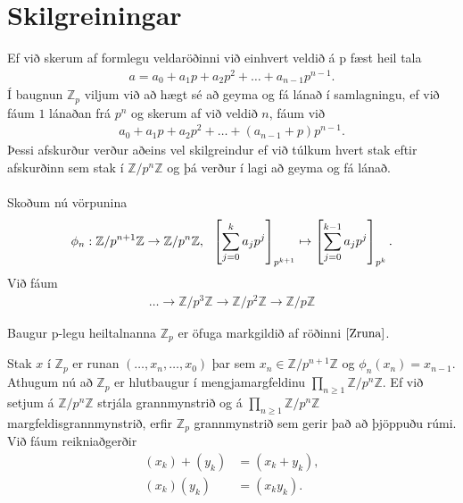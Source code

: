 \section*{Skilgreiningar}
Ef við skerum af formlegu veldaröðinni við einhvert veldið á p fæst heil tala 
\begin{align*}
a = a_0 + a_1 p + a_2 p^2 + \ldots + a_{n-1}p^{n-1}. 
\end{align*}
Í baugnun $\mathbb{Z}_p$ viljum við að hægt sé að geyma og fá lánað í samlagningu, ef við 
fáum $1$ lánaðan frá $p^n$ og skerum af við veldið $n$, fáum við 
\begin{align*}
 a_0 + a_1 p + a_2 p^2 + \ldots + (a_{n-1} + p)p^{n-1}.
\end{align*}
Þessi afskurður verður aðeins vel skilgreindur ef við túlkum hvert 
stak eftir afskurðinn sem stak í $\mathbb{Z}/p^n \mathbb{Z}$ og þá 
verður í lagi að geyma og fá lánað.\\
\\Skoðum nú vörpunina
\begin{align*}
 \centering \phi_n : \mathbb{Z}/p^{n+1} \mathbb{Z} \rightarrow 
 \mathbb{Z}/p^{n} \mathbb{Z}, \ \  \left[\sum_{j=0}^k a_j p^j \right]
_{p^{k+1}} \mapsto \left[\sum_{j=0}^{k-1} a_j p^j \right]_{p^k}.
\end{align*}
Við fáum
\begin{align}\label{Zruna}
 \ldots \rightarrow \mathbb{Z}/p^{3} \mathbb{Z} \rightarrow \mathbb{Z}/p^{2} 
\mathbb{Z} \rightarrow \mathbb{Z}/p \mathbb{Z}
\end{align}
\begin{skilgr}
 Baugur p-legu heiltalnanna $\mathbb{Z}_p$ er öfuga markgildið af 
röðinni $\ref{Zruna}$.
\end{skilgr}
Stak $x$ í $\mathbb{Z}_p$ er runan $(\ldots , x_n, \ldots, x_0)$ þar sem 
$x_n \in \mathbb{Z}/p^{n+1}\mathbb{Z}$ og $\phi_n(x_{n}) = x_{n-1}$.
Athugum nú að $\mathbb{Z}_p$ er hlutbaugur í mengjamargfeldinu
 $\prod_{n \geq 1} \mathbb{Z}/p^n\mathbb{Z}$. Ef við setjum á 
$\mathbb{Z}/p^n\mathbb{Z}$ strjála grannmynstrið og á 
$\prod_{n \geq 1} \mathbb{Z}/p^n\mathbb{Z}$ 
margfeldisgrannmynstrið, erfir $\mathbb{Z}_p$ grannmynstrið sem 
gerir það að þjöppuðu rúmi.\\
Við fáum reikniaðgerðir
\begin{align*}
 (x_k) + (y_k) &= (x_k + y_k), \\
(x_k)(y_k) &= (x_k y_k).
\end{align*}
